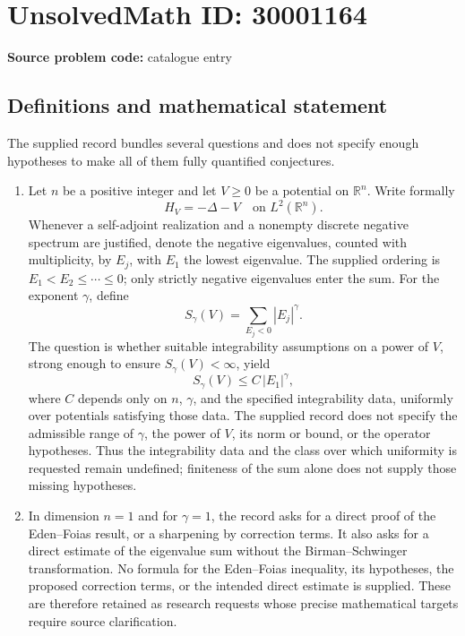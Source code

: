 \documentclass[11pt]{article}
\newcommand{\R}{\mathbb{R}}
\begin{document}
\section*{UnsolvedMath ID: 30001164}
\textbf{Source problem code:} catalogue entry
\subsection{Definitions and mathematical statement}
The supplied record bundles several questions and does not specify enough hypotheses to make all of them fully quantified conjectures.

\begin{enumerate}
\item Let \(n\) be a positive integer and let \(V\geq 0\) be a potential on \(\R^n\). Write formally
\[
H_V=-\Delta-V\quad\text{on }L^2(\R^n).
\]
Whenever a self-adjoint realization and a nonempty discrete negative spectrum are justified, denote the negative eigenvalues, counted with multiplicity, by \(E_j\), with \(E_1\) the lowest eigenvalue. The supplied ordering is \(E_1<E_2\leq\cdots\leq0\); only strictly negative eigenvalues enter the sum. For the exponent \(\gamma\), define
\[
S_\gamma(V)=\sum_{E_j<0}|E_j|^\gamma.
\]
The question is whether suitable integrability assumptions on a power of \(V\), strong enough to ensure \(S_\gamma(V)<\infty\), yield
\[
S_\gamma(V)\leq C\,|E_1|^\gamma,
\]
where \(C\) depends only on \(n\), \(\gamma\), and the specified integrability data, uniformly over potentials satisfying those data. The supplied record does not specify the admissible range of \(\gamma\), the power of \(V\), its norm or bound, or the operator hypotheses. Thus the integrability data and the class over which uniformity is requested remain undefined; finiteness of the sum alone does not supply those missing hypotheses.

\item In dimension \(n=1\) and for \(\gamma=1\), the record asks for a direct proof of the Eden--Foias result, or a sharpening by correction terms. It also asks for a direct estimate of the eigenvalue sum without the Birman--Schwinger transformation. No formula for the Eden--Foias inequality, its hypotheses, the proposed correction terms, or the intended direct estimate is supplied. These are therefore retained as research requests whose precise mathematical targets require source clarification.


\end{enumerate}
\end{document}
